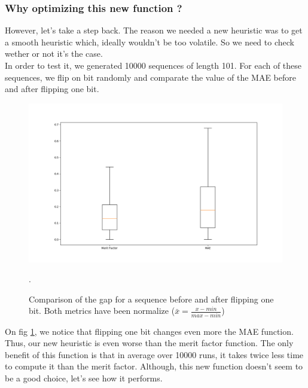 \documentclass[a4paper,11pt,openany]{article}
\begin{document}
\subsubsection{Why optimizing this new function ?}
\noindent
However, let's take a step back. The reason we needed a new heuristic was to get a smooth heuristic which, ideally wouldn't be too volatile. So we need to check wether or not it's the case.\\
In order to test it, we generated 10000 sequences of length 101. For each of these sequences, we flip on bit randomly and comparate the value of the MAE before and after flipping one bit.\\
\begin{figure}[H]
\begin{center}
\includegraphics[scale=0.2]{Images/compare_mf_mae}
\caption{Comparison of the gap for a sequence before and after flipping one bit. Both metrics have been normalize ($\bar{x}=\frac{x-min}{max-min}$)}.
\label{fig:compare_mf_mae}
\end{center}
\end{figure}
\noindent
On fig \ref{fig:compare_mf_mae}, we notice that flipping one bit changes even more the MAE function. Thus, our new heuristic is even worse than the merit factor function. The only benefit of this function is that in average over 10000 runs, it takes twice less time to compute it than the merit factor. Although, this new function doesn't seem to be a good choice, let's see how it performs.
\end{document}
